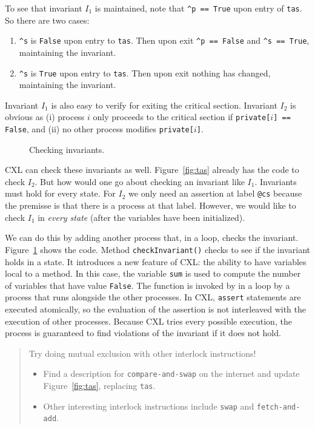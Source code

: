 \documentclass{report}
\newenvironment{code}{
\tcolorbox
}{
\endtcolorbox
}
\begin{document}
To see that invariant $I_1$ is maintained, note that
\texttt{\^{}p == True} upon entry of \texttt{tas}.
So there are two cases:
\begin{enumerate}
\item \texttt{\^{}s} is \texttt{False} upon entry to \texttt{tas}.
Then upon exit \texttt{\^{}p == False} and \texttt{\^{}s == True}, maintaining
the invariant.
\item \texttt{\^{}s} is \texttt{True} upon entry to \texttt{tas}.
Then upon exit nothing has changed, maintaining the invariant.
\end{enumerate}
Invariant $I_1$ is also easy to verify for exiting the critical section.
Invariant $I_2$ is obvious as (i) process $i$ only proceeds to the critical
section if \texttt{private[$i$] == False}, and (ii) no other process modifies
\texttt{private[$i$]}.

\begin{figure}
\begin{code}

\end{code}
\caption{Checking invariants.}
\label{fig:tasinv}
\end{figure}

CXL can check these invariants as well.  Figure~\ref{fig:tas} already
has the code to check $I_2$.  But how would one go about checking an
invariant like $I_1$.  Invariants must hold for every state.
For $I_2$ we only need an assertion at label \texttt{@cs} because the
premisse is that there is a process at that label.  However, we would
like to check $I_1$ in \emph{every state} (after the variables have
been initialized).

We can do this by adding another process that, in a loop,
checks the invariant.  Figure~\ref{fig:tasinv} shows the code.
Method \texttt{checkInvariant()} checks to see if the invariant holds
in a state.  It introduces a new feature of CXL: the ability to have
variables local to a method.  In this case, the variable \texttt{sum}
is used to compute the number of variables that have value
\texttt{False}.
The function is invoked by in a loop by a process that runs alongside
the other processes.
In CXL, \texttt{assert} statements are executed atomically, so the
evaluation of the assertion is not interleaved with the execution
of other processes.
Because CXL tries every possible execution, the process is guaranteed
to find violations of the invariant if it does not hold.

\begin{quote}
Try doing mutual exclusion with other interlock instructions!
\begin{itemize}
\item Find a description for \texttt{compare-and-swap} on the internet and
update Figure~\ref{fig:tas}, replacing \texttt{tas}.
\item Other interesting interlock instructions include \texttt{swap} and
\texttt{fetch-and-add}.
\end{itemize}
\end{quote}
\end{document}
